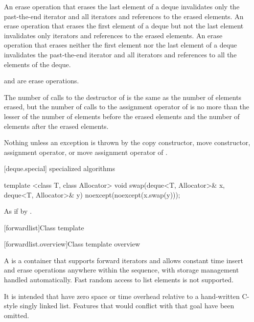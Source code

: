 \begin{itemdescr}
\pnum
\effects
An erase operation that erases the last element of a deque invalidates only the past-the-end iterator
and all iterators and references to the erased elements. An erase operation that erases the first
element of a deque but not the last element invalidates only iterators
and references to the erased elements. An erase operation
that erases neither the first element nor the last element of a deque invalidates the past-the-end
iterator and all iterators and references to all the elements of the deque.
\begin{note}  and  are erase operations. \end{note}

\pnum
\complexity
The number of calls to the destructor of  is the same as the
number of elements erased, but the number of calls to the assignment operator of  is
no more than the lesser of the number of elements before the erased elements and the number of elements after the erased elements.

\pnum
\throws
Nothing unless an exception is thrown by the copy constructor, move constructor,
assignment operator, or move assignment operator of
.
\end{itemdescr}

[deque.special]{ specialized algorithms}

%
%
\begin{itemdecl}
template <class T, class Allocator>
  void swap(deque<T, Allocator>& x, deque<T, Allocator>& y)
    noexcept(noexcept(x.swap(y)));
\end{itemdecl}

\begin{itemdescr}
\pnum
\effects
As if by .
\end{itemdescr}

[forwardlist]{Class template }

[forwardlist.overview]{Class template  overview}

\pnum
A  is a container that supports forward iterators and allows
constant time insert and erase operations anywhere within the sequence, with storage
management handled automatically. Fast random access to list elements is not supported.
\begin{note} It is intended that  have zero space or time overhead
relative to a hand-written C-style singly linked list. Features that would conflict with
that goal have been omitted.\end{note}

